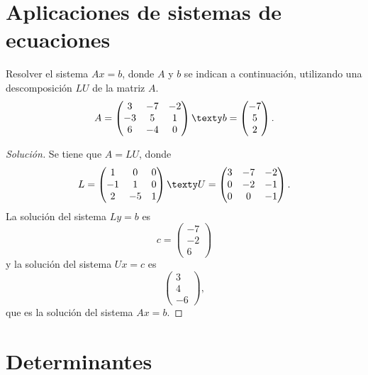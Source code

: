 \documentclass[a4,11pt]{aleph-notas}
\begin{document}
\section{Aplicaciones de sistemas de ecuaciones}

\begin{ejer}
    Resolver el sistema $Ax = b$, donde $A$ y $b$ se indican a continuación, utilizando una descomposición $LU$ de la matriz $A$.
    \[
        A = \begin{pmatrix}
        3 & -7 & -2\\
        -3 & 5 & 1\\
        6 & -4 & 0
        \end{pmatrix} \texty b = \begin{pmatrix}
        -7 \\ 5 \\ 2
        \end{pmatrix}.
    \]
\end{ejer}

\begin{proof}[Solución]\hspace{0pt}
    Se tiene que $A=LU$, donde
    \[
    L = \begin{pmatrix}
    1 & 0 & 0\\
    -1 & 1 & 0\\
    2 & -5 & 1
    \end{pmatrix} \texty U = \begin{pmatrix}
    3 & -7 & -2\\
    0 & -2 & -1\\
    0 & 0 & -1
    \end{pmatrix}.
    \]
    La solución del sistema $Ly = b$ es
    \[
    c = \begin{pmatrix}
    -7 \\ -2 \\ 6
    \end{pmatrix}
    \]
    y la solución del sistema $Ux = c$ es
    \[
    \begin{pmatrix}
    3 \\ 4 \\ -6
    \end{pmatrix},
    \]
    que es la solución del sistema $Ax = b$.
\end{proof}

\section{Determinantes}
\end{document}
